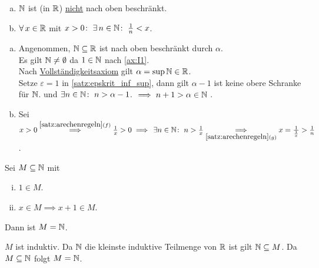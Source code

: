 \documentclass[../ana1.tex]{subfiles}
\begin{document}
\begin{satz}\label{satz:arch_prinz}\leavevmode
	\begin{enumerate}[(a)]
		\item \(\mathbb{N} \) ist (in \(\mathbb{R} \)) \underline{nicht} nach oben beschränkt.
		\item \(\forall \, x \in \mathbb{R} \) mit \(x > 0 \colon \; \exists \, n \in \mathbb{N} \colon \; \frac{1}{n} < x \).
	\end{enumerate}
\end{satz}
\begin{bew}\leavevmode
	\begin{enumerate}[(a)]
		\item Angenommen, \(\mathbb{N} \subseteq \mathbb{R} \) ist nach oben beschränkt durch \(\alpha \). \\
		      Es gilt \(\mathbb{N} \neq \emptyset \) da \(1 \in \mathbb{N} \) nach \autoref{ax:I1}. \\
		      Nach \hyperref[ax:V]{Vollständigkeitsaxiom} gilt \(\alpha = \sup \mathbb{N} \in \mathbb{R} \). \\
		      Setze \(\varepsilon = 1 \) in \autoref{satz:epskrit_inf_sup}, dann gilt \(\alpha - 1 \) ist keine obere Schranke für \(\mathbb{N} \).
		      und \(\exists n \in \mathbb{N} \colon \; n > \alpha - 1 \).
			  \(\implies n+1 > \alpha \in \mathbb{N} \) \Lightning.
		\item Sei \(x > 0 \overset{\autoref{satz:arechenregeln}{(f)}}{\implies} \frac{1}{x} > 0 \implies \, \exists n \in \N \colon \; n > \frac{1}{x} \\
		      \underset{\autoref{satz:arechenregeln}{(g)}}{\implies} x = \frac{1}{\frac{1}{x}} > \frac{1}{n} \).\qedhere
	\end{enumerate}
\end{bew}

\begin{satz}[Induktionsprinzip]\label{satz:ind_prinz}
	Sei \(M \subseteq \mathbb{N} \) mit
	\begin{enumerate}[(i)]
		\item \(1\in M \).
		\item \(x \in M \implies x + 1 \in M \).
	\end{enumerate}
	Dann ist \(M = \mathbb{N} \).
\end{satz}
\begin{bew}
	\(M \) ist induktiv. Da \(\mathbb{N} \) die kleinste induktive Teilmenge von \(\mathbb{R} \) ist gilt \(\mathbb{N} \subseteq M \).
	Da \(M \subseteq \mathbb{N} \) folgt \(M = \mathbb{N} \).
\end{bew}
\end{document}
